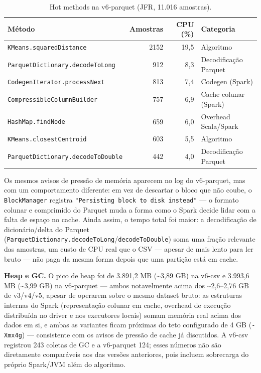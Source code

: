 \begin{table}[H]
\centering
\small
\begin{tabular}{p{7.4cm}rrp{3cm}}
\hline
\textbf{Método} & \textbf{Amostras} & \textbf{CPU (\%)} & \textbf{Categoria} \\
\hline
\texttt{KMeans.squaredDistance}       & 2152 & 19{,}5 & Algoritmo \\
\texttt{ParquetDictionary.decodeToLong} & 912 &  8{,}3 & Decodificação Parquet \\
\texttt{CodegenIterator.processNext}  &  813 &  7{,}4 & Codegen (Spark) \\
\texttt{CompressibleColumnBuilder}    &  757 &  6{,}9 & Cache colunar (Spark) \\
\texttt{HashMap.findNode}             &  659 &  6{,}0 & Overhead Scala/Spark \\
\texttt{KMeans.closestCentroid}       &  603 &  5{,}5 & Algoritmo \\
\texttt{ParquetDictionary.decodeToDouble} & 442 & 4{,}0 & Decodificação Parquet \\
\hline
\end{tabular}
\caption{Hot methods na v6-parquet (JFR, 11.016 amostras).}
\label{tab:jfr-hot-v6-parquet}
\end{table}

Os mesmos avisos de pressão de memória aparecem no log do v6-parquet,
mas com um comportamento diferente: em vez de descartar o bloco que não
coube, o \texttt{BlockManager} registra \texttt{"Persisting block to
disk instead"} --- o formato colunar e comprimido do Parquet muda a
forma como o Spark decide lidar com a falta de espaço no cache. Ainda
assim, o tempo total foi maior: a decodificação de dicionário/delta do
Parquet (\texttt{ParquetDictionary.decodeToLong}/\texttt{decodeToDouble})
soma uma fração relevante das amostras, um custo de CPU real que o CSV
--- apesar de mais lento para ler bruto --- não paga da mesma forma
depois que uma partição está em cache.

\textbf{Heap e GC.} O pico de heap foi de 3.891,2 MB
(\textasciitilde3,89 GB) na v6-csv e 3.993,6 MB (\textasciitilde3,99 GB)
na v6-parquet --- ambos notavelmente acima dos \textasciitilde2,6--2,76
GB de v3/v4/v5, apesar de operarem sobre o mesmo dataset bruto: as
estruturas internas do Spark (representação colunar em cache, overhead
de execução distribuída no driver e nos executores locais) somam
memória real acima dos dados em si, e ambas as variantes ficam próximas
do teto configurado de 4 GB (\texttt{-Xmx4g}) --- consistente com os
avisos de pressão de cache já discutidos. A v6-csv registrou 243
coletas de GC e a v6-parquet 124; esses números não são diretamente
comparáveis aos das versões anteriores, pois incluem sobrecarga do
próprio Spark/JVM além do algoritmo.

